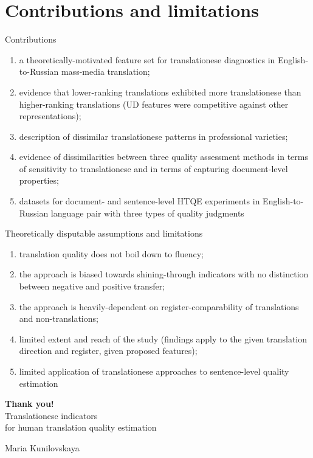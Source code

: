 \documentclass[11pt]{beamer} %
\begin{document}
\section{Contributions and limitations}


\begin{frame}{Contributions}
	\begin{enumerate}
		\item a theoretically-motivated feature set for translationese diagnostics in English-to-Russian mass-media translation;
		\item evidence that lower-ranking translations exhibited more translationese than higher-ranking translations (UD features were competitive against other representations);
		\item description of dissimilar translationese patterns in professional varieties;
		\item evidence of dissimilarities between three quality assessment methods in terms of sensitivity to translationese and in terms of capturing document-level properties;
		\item datasets for document- and sentence-level HTQE experiments in English-to-Russian language pair with three types of quality judgments
	\end{enumerate}
\end{frame}

\begin{frame}{Theoretically disputable assumptions and limitations}
	\begin{enumerate}
		\item translation quality does not boil down to fluency;
		\item the approach is biased towards shining-through indicators with no distinction between negative and positive transfer;
		\item the approach is heavily-dependent on register-comparability of translations and non-translations;
		\item limited extent and reach of the study (findings apply to the given translation direction and register, given proposed features);
		\item limited application of translationese approaches to sentence-level quality estimation
	\end{enumerate}
\end{frame}

\begin{frame}[plain]
\centering
\Large \textbf{Thank you!}\\
	\vspace{.5em}
	Translationese indicators \\for human translation quality estimation\\
	\vspace{.5em}
\centering

\vspace{2em}
\small
Maria Kunilovskaya \\ 

\end{frame}
\end{document}
